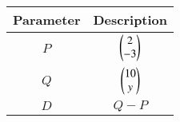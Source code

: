 \begin{tabular}[12pt]{ |c| c|}
    \hline
    Parameter & Description\\ 
    \hline
    $P$ & $\begin{pmatrix}2\\-3\end{pmatrix}$ \\
    \hline 
    $Q$ & $\begin{pmatrix}10\\y\end{pmatrix}$ \\
	\hline
    $D$ & $Q-P$\\
    \hline 
    \end{tabular}
